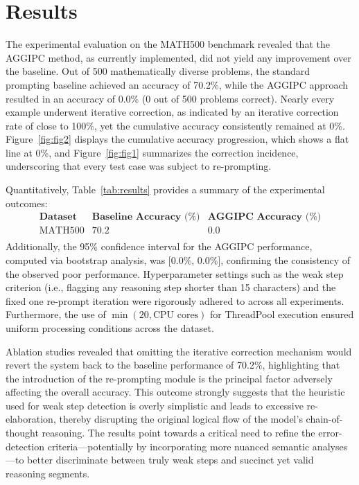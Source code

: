 \documentclass[11pt]{article}
\begin{document}
\section{Results}
The experimental evaluation on the MATH500 benchmark revealed that the AGGIPC method, as currently implemented, did not yield any improvement over the baseline. Out of 500 mathematically diverse problems, the standard prompting baseline achieved an accuracy of 70.2\%, while the AGGIPC approach resulted in an accuracy of 0.0\% (0 out of 500 problems correct). Nearly every example underwent iterative correction, as indicated by an iterative correction rate of close to 100\%, yet the cumulative accuracy consistently remained at 0\%. Figure~\ref{fig:fig2} displays the cumulative accuracy progression, which shows a flat line at 0\%, and Figure~\ref{fig:fig1} summarizes the correction incidence, underscoring that every test case was subject to re-prompting.

Quantitatively, Table~\ref{tab:results} provides a summary of the experimental outcomes:
\[
\begin{array}{lcc}
\textbf{Dataset} & \textbf{Baseline Accuracy (\%)} & \textbf{AGGIPC Accuracy (\%)} \\
\hline
\text{MATH500} & 70.2 & 0.0 \\
\end{array}
\]
Additionally, the 95\% confidence interval for the AGGIPC performance, computed via bootstrap analysis, was [0.0\%, 0.0\%], confirming the consistency of the observed poor performance. Hyperparameter settings such as the weak step criterion (i.e., flagging any reasoning step shorter than 15 characters) and the fixed one re-prompt iteration were rigorously adhered to across all experiments. Furthermore, the use of \(\min(20, \text{CPU cores})\) for ThreadPool execution ensured uniform processing conditions across the dataset.

Ablation studies revealed that omitting the iterative correction mechanism would revert the system back to the baseline performance of 70.2\%, highlighting that the introduction of the re-prompting module is the principal factor adversely affecting the overall accuracy. This outcome strongly suggests that the heuristic used for weak step detection is overly simplistic and leads to excessive re-elaboration, thereby disrupting the original logical flow of the model’s chain-of-thought reasoning. The results point towards a critical need to refine the error-detection criteria—potentially by incorporating more nuanced semantic analyses—to better discriminate between truly weak steps and succinct yet valid reasoning segments.
\end{document}
